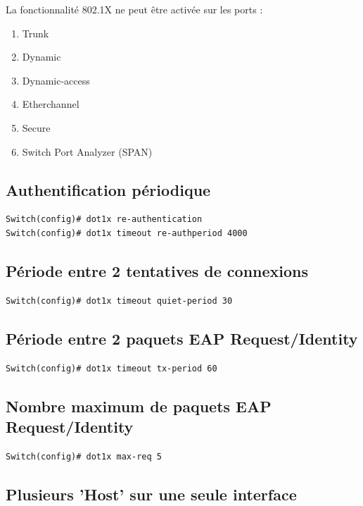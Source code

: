 La fonctionnalité 802.1X ne peut être activée sur les ports :
\begin{enumerate}
\item Trunk
\item Dynamic
\item Dynamic-access
\item Etherchannel
\item Secure
\item Switch Port Analyzer (SPAN)
\end{enumerate}

\subsection{Authentification périodique}

\begin{verbatim}
Switch(config)# dot1x re-authentication
Switch(config)# dot1x timeout re-authperiod 4000
\end{verbatim}

\subsection{Période entre 2 tentatives de connexions}

\begin{verbatim}
Switch(config)# dot1x timeout quiet-period 30
\end{verbatim}

\subsection{Période entre 2 paquets EAP Request/Identity}

\begin{verbatim}
Switch(config)# dot1x timeout tx-period 60
\end{verbatim}

\subsection{Nombre maximum de paquets EAP Request/Identity}

\begin{verbatim}
Switch(config)# dot1x max-req 5
\end{verbatim}

\subsection{Plusieurs 'Host' sur une seule interface}

